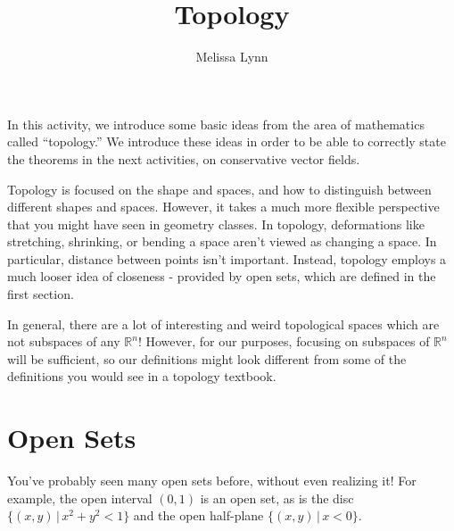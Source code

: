 \documentclass{ximera}
\title{Topology}
\author{Melissa Lynn}
\begin{document}
  
\begin{abstract}  
\end{abstract}  
\maketitle

In this activity, we introduce some basic ideas from the area of mathematics called ``topology.'' We introduce these ideas in order to be able to correctly state the theorems in the next activities, on conservative vector fields.

Topology is focused on the shape and spaces, and how to distinguish between different shapes and spaces. However, it takes a much more flexible perspective that you might have seen in geometry classes. In topology, deformations like stretching, shrinking, or bending a space aren't viewed as changing a space. In particular, distance between points isn't important. Instead, topology employs a much looser idea of closeness - provided by open sets, which are defined in the first section.

In general, there are a lot of interesting and weird topological spaces which are not subspaces of any $\mathbb{R}^n$! However, for our purposes, focusing on subspaces of $\mathbb{R}^n$ will be sufficient, so our definitions might look different from some of the definitions you would see in a topology textbook. 

\section{Open Sets}

You've probably seen many open sets before, without even realizing it! For example, the open interval $(0,1)$ is an open set, as is the disc $\{(x,y)\,|\,x^2+y^2<1\}$ and the open half-plane $\{(x,y)\,|\,x<0\}$.
\end{document}
